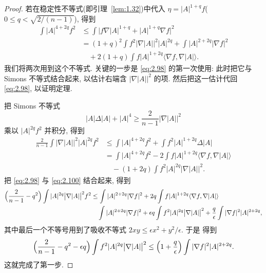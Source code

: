 \begin{proof}
若在稳定性不等式(即引理~\ref{lem:1.32})中代入
$\eta=|A|^{1+q}f$($0\leq q<\sqrt{2/(n-1)}$), 得到
\begin{equation}
\begin{aligned}
\int|A|^{4+2q}f^{2}
&\leq\int\bigl|f\nabla|A|^{1+q}+|A|^{1+q}\nabla f\bigr|^{2}\\
&=(1+q)^{2}\int f^{2}\bigl|\nabla|A|\bigr|^{2}|A|^{2q}
 +\int|A|^{2+2q}|\nabla f|^{2}\\
&\quad +2(1+q)\int f|A|^{1+2q}\langle\nabla f,\nabla|A|\rangle.
\end{aligned}
\label{eq:2.98}
\end{equation}
我们将两次用到这个不等式. 关键的一步是 \eqref{eq:2.98} 的第一次使用: 此时把它与 Simons
不等式结合起来, 以估计右端含 $|\nabla|A||^{2}$ 的项. 然后把这一估计代回
\eqref{eq:2.98}, 以证明定理.

把 Simons 不等式
\begin{equation}
|A|\Delta|A|+|A|^{4}\geq\frac{2}{n-1}\bigl|\nabla|A|\bigr|^{2}
\label{eq:2.99}
\end{equation}
乘以 $|A|^{2q}f^{2}$ 并积分, 得到
\begin{equation}
\begin{aligned}
\frac{2}{n-1}\int\bigl|\nabla|A|\bigr|^{2}|A|^{2q}f^{2}
&\leq\int|A|^{4+2q}f^{2}+\int f^{2}|A|^{1+2q}\Delta|A|\\
&=\int|A|^{4+2q}f^{2}
 -2\int f|A|^{1+2q}\langle\nabla f,\nabla|A|\rangle\\
&\quad -(1+2q)\int f^{2}|A|^{2q}\bigl|\nabla|A|\bigr|^{2}.
\end{aligned}
\label{eq:2.100}
\end{equation}
把 \eqref{eq:2.98} 与 \eqref{eq:2.100} 结合起来, 得到
\begin{align}
\Bigl(\frac{2}{n-1}-q^{2}\Bigr)\int|A|^{2q}\bigl|\nabla|A|\bigr|^{2}f^{2}
&\leq\int|A|^{2+2q}|\nabla f|^{2}
 +2q\int f|A|^{1+2q}\langle\nabla f,\nabla|A|\rangle
\label{eq:2.101}\\
&\quad \int|A|^{2+2q}|\nabla f|^{2}
 +\epsilon q\int f^{2}|A|^{2q}\bigl|\nabla|A|\bigr|^{2}
 +\frac{q}{\epsilon}\int|\nabla f|^{2}|A|^{2+2q},
\label{eq:2.102}
\end{align}
其中最后一个不等号用到了吸收不等式 $2xy\leq\epsilon x^{2}+y^{2}/\epsilon$. 于是
得到
\begin{equation}
\Bigl(\frac{2}{n-1}-q^{2}-\epsilon q\Bigr)
 \int f^{2}|A|^{2q}\bigl|\nabla|A|\bigr|^{2}
 \leq\Bigl(1+\frac{q}{\epsilon}\Bigr)\int|\nabla f|^{2}|A|^{2+2q}.
\label{eq:2.103}
\end{equation}
这就完成了第一步.


\end{proof}

